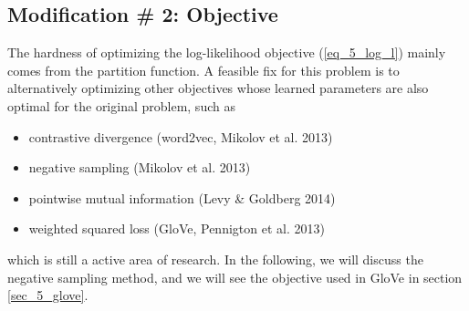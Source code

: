 \documentclass[../book-template.tex]{subfiles}
\begin{document}
\subsection{Modification \# 2: Objective}
The hardness of optimizing the log-likelihood objective (\ref{eq_5_log_l}) mainly comes from the partition function. A feasible fix for this problem is to alternatively optimizing other objectives whose learned parameters are also optimal for the original problem, such as
\begin{itemize}
	\item contrastive divergence (word2vec, Mikolov et al. 2013)
	\item negative sampling (Mikolov et al. 2013)
	\item pointwise mutual information (Levy \& Goldberg 2014)
	\item weighted squared loss (GloVe, Pennigton et al. 2013)
\end{itemize}
which is still a active area of research. In the following, we will discuss the negative sampling method, and we will see the objective used in GloVe in section \ref{sec_5_glove}.
\end{document}
